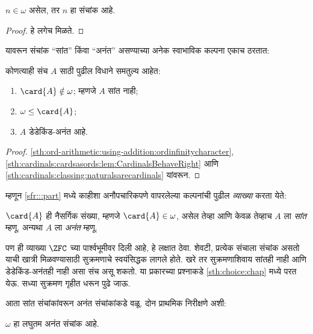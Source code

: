 \begin{cor}\label{sth:cardinals:classing:naturalsarecardinals}
$n \in \omega$ असेल, तर $n$ हा संचांक आहे.
\end{cor}

\begin{proof}
हे लगेच मिळते.
\end{proof}
\noindent
यावरून संचांक “सांत” किंवा “अनंत” असण्याच्या अनेक स्वाभाविक कल्पना एकाच ठरतात:
\begin{thm}\label{sth:cardinals:classing:generalinfinitycharacter}कोणत्याही संच $A$ साठी पुढील विधाने समतुल्य आहेत:
\begin{enumerate}
  \item\label{sth:cardinals:classing:card:notinomega} $\card{A} \notin \omega$; म्हणजे
  $A$ सांत नाही;
  \item\label{sth:cardinals:classing:card:omegaplus} $\omega \leq \card{A}$;
  \item\label{sth:cardinals:classing:card:infinite} $A$ डेडेकिंड-अनंत आहे.
\end{enumerate}
\end{thm}

\begin{proof}
\ref{sth:ord-arithmetic:using-addition:ordinfinitycharacter},
\ref{sth:cardinals:cardsasords:lem:CardinalsBehaveRight} आणि
\ref{sth:cardinals:classing:naturalsarecardinals} यांवरून.
\end{proof}

म्हणून \ref{sfr:::part} मध्ये काहीशा अनौपचारिकपणे वापरलेल्या कल्पनांची पुढील \emph{व्याख्या} करता येते:

\begin{defn}\label{sth:cardinals:classing:defnfinite}
$\card{A}$ ही नैसर्गिक संख्या, म्हणजे $\card{A} \in \omega$, असेल तेव्हा आणि केवळ तेव्हाच $A$ ला \emph{सांत} म्हणू. अन्यथा $A$ ला \emph{अनंत} म्हणू.
\end{defn}
\noindent
पण ही व्याख्या $\ZFC$ च्या पार्श्वभूमीवर दिली आहे, हे लक्षात ठेवा. शेवटी, प्रत्येक संचाला संचांक असतो याची खात्री मिळवण्यासाठी सुक्रमणाचे स्वयंसिद्धक लागले होते. खरे तर सुक्रमणाशिवाय सांतही नाही आणि डेडेकिंड-अनंतही नाही असा संच असू शकतो. या प्रकारच्या प्रश्नाकडे \ref{sth:choice:chap} मध्ये परत येऊ. सध्या सुक्रमण गृहीत धरून पुढे जाऊ.

आता सांत संचांकांवरून अनंत संचांकांकडे वळू. दोन प्राथमिक निरीक्षणे अशी:

\begin{cor}\label{sth:cardinals:classing:omegaisacardinal}
$\omega$ हा लघुतम अनंत संचांक आहे.
\end{cor}

